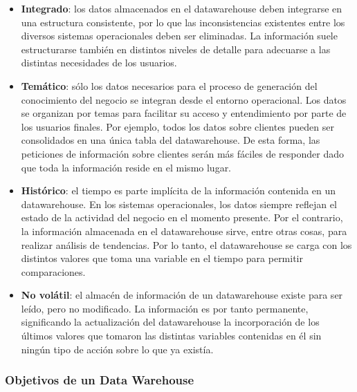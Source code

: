 \documentclass[11pt,a4paper]{article}
\begin{document}
				\begin{itemize}
					\item \textbf{Integrado}: los datos almacenados en el datawarehouse deben integrarse en una estructura consistente, por lo que las inconsistencias existentes entre los diversos sistemas operacionales deben ser eliminadas. La información suele estructurarse también en distintos niveles de detalle para adecuarse a las distintas necesidades de los usuarios.
					
					\item \textbf{Temático}: sólo los datos necesarios para el proceso de generación del conocimiento del negocio se integran desde el entorno operacional. Los datos se organizan por temas para facilitar su acceso y entendimiento por parte de los usuarios finales. Por ejemplo, todos los datos sobre clientes pueden ser consolidados en una única tabla del datawarehouse. De esta forma, las peticiones de información sobre clientes serán más fáciles de responder dado que toda la información reside en el mismo lugar.
					
					\item \textbf{Histórico}: el tiempo es parte implícita de la información contenida en un datawarehouse. En los sistemas operacionales, los datos siempre reflejan el estado de la actividad del negocio en el momento presente. Por el contrario, la información almacenada en el datawarehouse sirve, entre otras cosas, para realizar análisis de tendencias. Por lo tanto, el datawarehouse se carga con los distintos valores que toma una variable en el tiempo para permitir comparaciones.	
					
					\item \textbf{No volátil}: el almacén de información de un datawarehouse existe para ser leído, pero no modificado. La información es por tanto permanente, significando la actualización del datawarehouse la incorporación de los últimos valores que tomaron las distintas variables contenidas en él sin ningún tipo de acción sobre lo que ya existía.
				\end{itemize}
			
			\subsubsection{Objetivos de un Data Warehouse}
			
\end{document}
